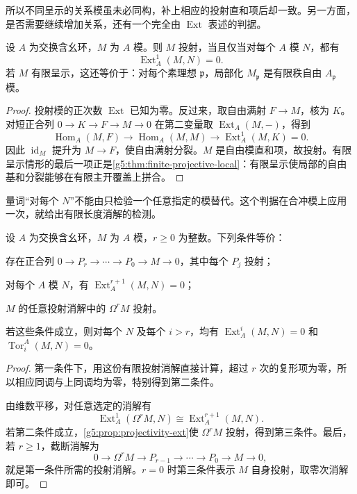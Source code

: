所以不同呈示的关系模虽未必同构，补上相应的投射直和项后却一致。另一方面，是否需要继续增加关系，还有一个完全由 \(\operatorname{Ext}\) 表述的判据。

\begin{proposition}\label{g5:prop:projectivity-ext}
	设 \(A\) 为交换含幺环，\(M\) 为 \(A\) 模。则 \(M\) 投射，当且仅当对每个 \(A\) 模 \(N\)，都有
	\[
		\operatorname{Ext}^1_A(M,N)=0.
	\]
	若 \(M\) 有限呈示，这还等价于：对每个素理想 \(\mathfrak p\)，局部化 \(M_{\mathfrak p}\) 是有限秩自由 \(A_{\mathfrak p}\) 模。
\end{proposition}
\begin{proof}
	投射模的正次数 \(\operatorname{Ext}\) 已知为零。反过来，取自由满射 \(F\to M\)，核为 \(K\)。对短正合列 \(0\to K\to F\to M\to0\) 在第二变量取 \(\operatorname{Ext}_A(M,-)\)，得到
	\[
		\operatorname{Hom}_A(M,F)\longrightarrow
		\operatorname{Hom}_A(M,M)\longrightarrow
		\operatorname{Ext}^1_A(M,K)=0.
	\]
	因此 \(\operatorname{id}_M\) 提升为 \(M\to F\)，使自由满射分裂。\(M\) 是自由模直和项，故投射。有限呈示情形的最后一项正是\cref{g5:thm:finite-projective-local}：有限呈示使局部的自由基和分裂能够在有限主开覆盖上拼合。
\end{proof}

量词“对每个 \(N\)”不能由只检验一个任意指定的模替代。这个判据在合冲模上应用一次，就给出有限长度消解的检测。

\begin{proposition}\label{g5:prop:resolution-length-ext}
	设 \(A\) 为交换含幺环，\(M\) 为 \(A\) 模，\(r\geq0\) 为整数。下列条件等价：
	\begin{equivalences}
		\item 存在正合列 \(0\to P_r\to\cdots\to P_0\to M\to0\)，其中每个 \(P_j\) 投射；
		\item 对每个 \(A\) 模 \(N\)，有 \(\operatorname{Ext}^{r+1}_A(M,N)=0\)；
		\item \(M\) 的任意投射消解中的 \(\Omega^rM\) 投射。
	\end{equivalences}
	若这些条件成立，则对每个 \(N\) 及每个 \(i>r\)，均有
	\(\operatorname{Ext}^i_A(M,N)=0\) 和 \(\operatorname{Tor}_i^A(M,N)=0\)。
\end{proposition}
\begin{proof}
	第一条件下，用这份有限投射消解直接计算，超过 \(r\) 次的复形项为零，所以相应同调与上同调均为零，特别得到第二条件。

	由维数平移，对任意选定的消解有
	\[
		\operatorname{Ext}^1_A(\Omega^rM,N)
		\cong\operatorname{Ext}^{r+1}_A(M,N).
	\]
	若第二条件成立，\cref{g5:prop:projectivity-ext}使 \(\Omega^rM\) 投射，得到第三条件。最后，若 \(r\geq1\)，截断消解为
	\[
		0\longrightarrow\Omega^rM\longrightarrow P_{r-1}
		\longrightarrow\cdots\longrightarrow P_0
		\longrightarrow M\longrightarrow0,
	\]
	就是第一条件所需的投射消解。\(r=0\) 时第三条件表示 \(M\) 自身投射，取零次消解即可。
\end{proof}


